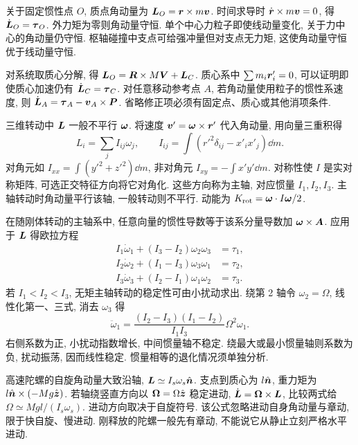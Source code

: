 \label{ch:angular}
关于固定惯性点 $O$, 质点角动量为 $\boldsymbol{L}_O=\boldsymbol{r}\times m\boldsymbol{v}$. 时间求导时 $\dot{\boldsymbol{r}}\times m\boldsymbol{v}=0$, 得 $\dot{\boldsymbol{L}}_O=\boldsymbol{\tau}_O$. 外力矩为零则角动量守恒. 单个中心力粒子即使线动量变化, 关于力中心的角动量仍守恒. 枢轴碰撞中支点可给强冲量但对支点无力矩, 这使角动量守恒优于线动量守恒.

对系统取质心分解, 得 $\boldsymbol{L}_O=\boldsymbol{R}\times M\boldsymbol{V}+\boldsymbol{L}_C$. 质心系中 $\sum m_i\boldsymbol{r}'_i=0$, 可以证明即使质心加速仍有 $\dot{\boldsymbol{L}}_C=\boldsymbol{\tau}_C$. 对任意移动参考点 $A$, 若角动量使用粒子的惯性系速度, 则 $\dot{\boldsymbol{L}}_A=\boldsymbol{\tau}_A-\boldsymbol{v}_A\times\boldsymbol{P}$. 省略修正项必须有固定点、质心或其他消项条件.

三维转动中 $\boldsymbol{L}$ 一般不平行 $\boldsymbol{\omega}$. 将速度 $\boldsymbol{v}'=\boldsymbol{\omega}\times\boldsymbol{r}'$ 代入角动量, 用向量三重积得
\begin{equation}
L_i=\sum_jI_{ij}\omega_j,\qquad
I_{ij}=\int(r'^2\delta_{ij}-x'_ix'_j)\dd m.
\end{equation}
对角元如 $I_{xx}=\int(y'^2+z'^2)\dd m$, 非对角元 $I_{xy}=-\int x'y'\dd m$. 对称性使 $I$ 是实对称矩阵, 可选正交特征方向将它对角化. 这些方向称为主轴, 对应惯量 $I_1,I_2,I_3$. 主轴转动时角动量平行该轴, 一般转动则不平行. 动能为 $K_{\rm rot}=\boldsymbol{\omega}\cdot I\boldsymbol{\omega}/2$.

在随刚体转动的主轴系中, 任意向量的惯性导数等于该系分量导数加 $\boldsymbol{\omega}\times\boldsymbol{A}$. 应用于 $\boldsymbol{L}$ 得欧拉方程
\begin{align}
I_1\dot\omega_1+(I_3-I_2)\omega_2\omega_3&=\tau_1,\\
I_2\dot\omega_2+(I_1-I_3)\omega_3\omega_1&=\tau_2,\\
I_3\dot\omega_3+(I_2-I_1)\omega_1\omega_2&=\tau_3.
\end{align}
若 $I_1<I_2<I_3$, 无矩主轴转动的稳定性可由小扰动求出. 绕第 2 轴令 $\omega_2=\Omega$, 线性化第一、三式, 消去 $\omega_3$ 得
\begin{equation}
\ddot\omega_1=\frac{(I_2-I_3)(I_1-I_2)}{I_1I_3}\Omega^2\omega_1.
\end{equation}
右侧系数为正, 小扰动指数增长, 中间惯量轴不稳定. 绕最大或最小惯量轴则系数为负, 扰动振荡, 因而线性稳定. 惯量相等的退化情况须单独分析.

高速陀螺的自旋角动量大致沿轴, $\boldsymbol{L}\simeq I_s\omega_s\hat{\boldsymbol{n}}$. 支点到质心为 $l\hat{\boldsymbol{n}}$, 重力矩为 $l\hat{\boldsymbol{n}}\times(-Mg\hat{\boldsymbol{z}})$. 若轴绕竖直方向以 $\boldsymbol{\Omega}=\Omega\hat{\boldsymbol{z}}$ 稳定进动, $\dot{\boldsymbol{L}}=\boldsymbol{\Omega}\times\boldsymbol{L}$, 比较两式给 $\Omega\simeq Mgl/(I_s\omega_s)$. 进动方向取决于自旋符号. 该公式忽略进动自身角动量与章动, 限于快自旋、慢进动. 刚释放的陀螺一般先有章动, 不能说它从静止立刻严格水平进动.

